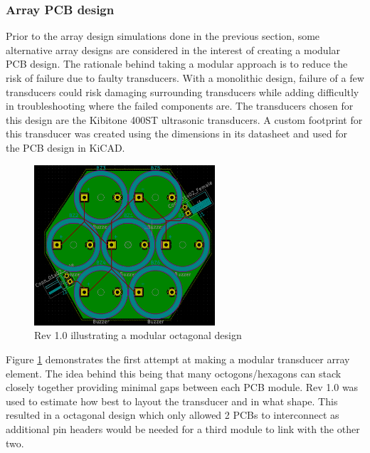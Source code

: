 \subsubsection{Array PCB design}
Prior to the array design simulations done in the previous section, some alternative array designs are considered in the interest of creating a modular PCB design. The rationale behind taking a modular approach is to reduce the risk of failure due to faulty transducers. With a monolithic design, failure of a few transducers could risk damaging surrounding transducers while adding difficultly in troubleshooting where the failed components are. The transducers chosen for this design are the Kibitone 400ST ultrasonic transducers. A custom footprint for this transducer was created using the dimensions in its datasheet and used for the PCB design in KiCAD.

\begin{figure}[ht!]
    \centering
    \includegraphics[width=0.6\textwidth]{Figures/Design/PCB/closeups/octogonalrev1.png}
    \caption{Rev 1.0 illustrating a modular octagonal design}
    \label{fig:modHex1.0}
\end{figure}

Figure \ref{fig:modHex1.0} demonstrates the first attempt at making a modular transducer array element. The idea behind this being that many octogons/hexagons can stack closely together providing minimal gaps between each PCB module. Rev 1.0 was used to estimate how best to layout the transducer and in what shape. This resulted in a octagonal design which only allowed 2 PCBs to interconnect as additional pin headers would be needed for a third module to link with the other two.

